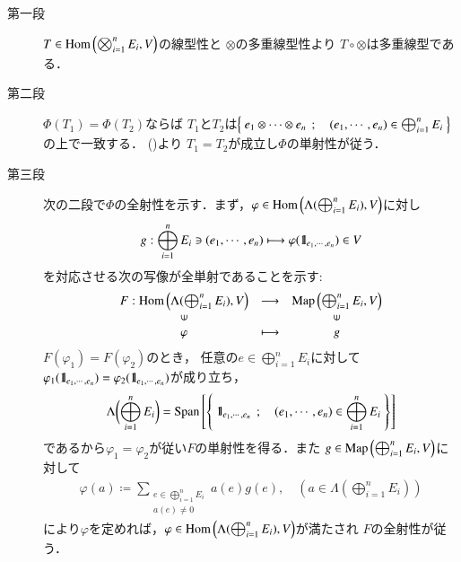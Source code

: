 	\begin{prf}\mbox{}
		\begin{description}
			\item[第一段]
				$T \in \mathrm{Hom} \left(\bigotimes_{i=1}^n E_i,V\right)$の線型性と
				$\otimes$の多重線型性より
				$T \circ \otimes$は多重線型である．
				
			\item[第二段]
				$\Phi(T_1) = \Phi(T_2)$ならば
				$T_1$と$T_2$は$\left\{\ e_1 \otimes \cdots \otimes e_n\ \, ; \quad (e_1,\cdots,e_n) \in \bigoplus_{i=1}^n E_i\ \right\}$の上で一致する．
				()より
				$T_1 = T_2$が成立し$\Phi$の単射性が従う．
			
			\item[第三段]
				次の二段で$\Phi$の全射性を示す．まず，$\varphi \in \mathrm{Hom} \left(\Lambda(\bigoplus_{i=1}^n E_i),V\right)$に対し
				\begin{align}
					g: \bigoplus_{i=1}^n E_i \ni (e_1,\cdots,e_n) \longmapsto \varphi(\mbox{1}\hspace{-0.25em}\mbox{l}_{e_1,\cdots,e_n}) \in V
				\end{align}
				を対応させる次の写像が全単射であることを示す:
				\begin{align}
					\begin{array}{ccc}
						F:\Hom{\Lambda(\bigoplus_{i=1}^n E_i)}{V} & \longrightarrow & \Map{\bigoplus_{i=1}^n E_i}{V} \\
						\rotatebox{90}{$\in$} & & \rotatebox{90}{$\in$} \\
						\varphi & \longmapsto & g
					\end{array}
				\end{align}
				$F(\varphi_1) = F(\varphi_2)$のとき，
				任意の$e \in \bigoplus_{i=1}^n E_i$に対して
				$\varphi_1(\mbox{1}\hspace{-0.25em}\mbox{l}_{e_1,\cdots,e_n}) = \varphi_2(\mbox{1}\hspace{-0.25em}\mbox{l}_{e_1,\cdots,e_n})$が成り立ち，
				\begin{align}
					\Lambda\biggl( \bigoplus_{i=1}^n E_i \biggr) 
					= \mathrm{Span}\left[ \left\{\ \mbox{1}\hspace{-0.25em}\mbox{l}_{e_1,\cdots,e_n}\ \, ; \quad (e_1,\cdots,e_n) \in \bigoplus_{i=1}^n E_i\ \right\} \right]
				\end{align}
				であるから$\varphi_1 = \varphi_2$が従い$F$の単射性を得る．また
				$g \in \mathrm{Map} \left(\bigoplus_{i=1}^n E_i,V\right)$に対して
				\begin{align}
					\varphi(a) \coloneqq \sum_{\substack{e \in \bigoplus_{i=1}^n E_i \\ a(e) \neq 0}} a(e) g(e),
					\quad (a \in \Lambda(\bigoplus_{i=1}^n E_i))
				\end{align}
				により$\varphi$を定めれば，$\varphi \in \mathrm{Hom} \left(\Lambda(\bigoplus_{i=1}^n E_i),V\right)$が満たされ
				$F$の全射性が従う．
				

\end{description}
\end{prf}
